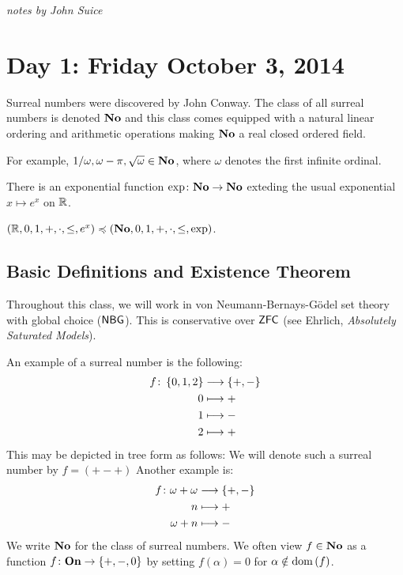\textit{notes by John Suice}

\section*{Day 1: Friday October 3, 2014}
Surreal numbers were discovered by John Conway. 
The class of all surreal numbers is denoted $\mathbf{No}$ and 
this class comes equipped with a natural linear ordering and 
arithmetic operations making $\mathbf{No}$ a real closed ordered field. 

For example, $1/ \omega, \omega - \pi, \sqrt{\omega} \in \mathbf{No}$, 
where $\omega$ denotes the first infinite ordinal. 

\begin{theorem}[Kruskal, 1980s]
	There is an exponential function $\exp \colon \mathbf{No} \rightarrow \mathbf{No}$
	exteding the usual exponential $x \mapsto e^x$ on $\mathbb{R}$. 
	\label{}
\end{theorem}

\begin{theorem}
	$(\mathbb{R}, 0, 1, +, \cdot, \leq, e^x) \preccurlyeq 
	(\mathbf{No}, 0, 1, +, \cdot, \leq, \exp)$. 	
	\label{}
\end{theorem}

\subsection*{Basic Definitions and Existence Theorem}
Throughout this class, we will work in von Neumann-Bernays-G\"odel 
set theory with global choice ($\mathsf{NBG}$). This is conservative over 
$\mathsf{ZFC}$ (see Ehrlich, \emph{Absolutely Saturated Models}). 

An example of a surreal number is the following: 
\begin{align*}
	f \colon \left\{ 0, 1, 2 \right\} &\longrightarrow \left\{ +, - \right\} \\
	0 &\longmapsto + \\
	1 &\longmapsto - \\
	2 &\longmapsto +
\end{align*}
This may be depicted in tree form as follows:
We will denote such a surreal number by $f=(+-+)$
Another example is: 
\begin{align*}
	f \colon \omega + \omega &\longrightarrow \left\{ +, - \right\} \\
	n &\longmapsto + \\
	\omega + n &\longmapsto -
\end{align*}
We write $\mathbf{No}$ for the class of surreal numbers. We often view 
$f \in \mathbf{No}$ as a function $f \colon \mathbf{On} \rightarrow \left\{ +, -, 0 \right\}$ by 
setting $f(\alpha) = 0$ for $\alpha \notin \operatorname{dom}\left( f \right)$. 

